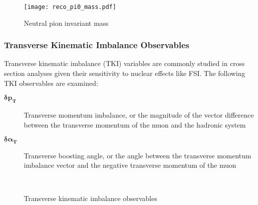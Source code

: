 \documentclass[../main.tex]{subfiles}
\begin{document}
\begin{figure}[H]
    \center
    \texttt{[image: reco\_pi0\_mass.pdf]}
    \caption[text]{Neutral pion invariant mass}
    \label{fig:reco_pi0_mass}
\end{figure}

\subsubsection{Transverse Kinematic Imbalance Observables}
Transverse kinematic imbalance (TKI) variables are commonly studied in cross section analyses given their sensitivity to nuclear effects like FSI.  The following TKI observables are examined:
\begin{description}
    \item[$\mathbf{\boldsymbol{\delta} p_{T}}$] Transverse momentum imbalance, or the magnitude of the vector difference between the transverse momentum of the muon and the hadronic system
    \item[$\mathbf{\boldsymbol{\delta} \boldsymbol{\alpha}_{T}}$] Transverse boosting angle, or the angle between the transverse momentum imbalance vector and the negative transverse momentum of the muon 
\end{description}

\begin{figure}[H]
    \center
     \\
     \label{subfig:reco_dalphaT}
    \caption{Transverse kinematic imbalance observables}
    \label{fig:tki_observables}
\end{figure}
\end{document}
